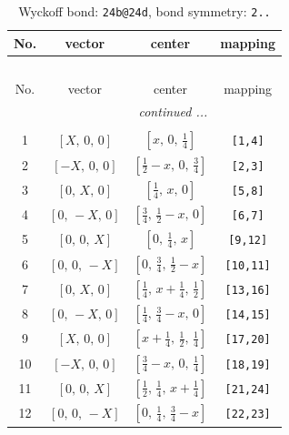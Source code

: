 \documentclass[fleqn,8pt]{jsarticle}
\begin{document}
\renewcommand{\arraystretch}{1.2}
\begin{longtable}{cccc}
\caption{Wyckoff bond: {\tt 24b@24d}, bond symmetry: {\tt 2..}}
 \\
 \hline \hline
No. & vector & center & mapping \\ \hline \endfirsthead

\multicolumn{3}{l}{\tablename\ \thetable{}} \\
 \hline \hline
No. & vector & center & mapping \\ \hline \endhead

 \hline \hline
\multicolumn{3}{r}{\footnotesize\it continued ...} \\ \endfoot

 \hline \hline
\multicolumn{3}{r}{} \\ \endlastfoot

1 & $\left[ X,\, 0,\, 0 \right]$ & $\left[ x,\, 0,\, \frac{1}{4} \right]$ & {\tt [1,4]} \\ \hline
2 & $\left[ - X,\, 0,\, 0 \right]$ & $\left[ \frac{1}{2} - x,\, 0,\, \frac{3}{4} \right]$ & {\tt [2,3]} \\ \hline
3 & $\left[ 0,\, X,\, 0 \right]$ & $\left[ \frac{1}{4},\, x,\, 0 \right]$ & {\tt [5,8]} \\ \hline
4 & $\left[ 0,\, - X,\, 0 \right]$ & $\left[ \frac{3}{4},\, \frac{1}{2} - x,\, 0 \right]$ & {\tt [6,7]} \\ \hline
5 & $\left[ 0,\, 0,\, X \right]$ & $\left[ 0,\, \frac{1}{4},\, x \right]$ & {\tt [9,12]} \\ \hline
6 & $\left[ 0,\, 0,\, - X \right]$ & $\left[ 0,\, \frac{3}{4},\, \frac{1}{2} - x \right]$ & {\tt [10,11]} \\ \hline
7 & $\left[ 0,\, X,\, 0 \right]$ & $\left[ \frac{1}{4},\, x + \frac{1}{4},\, \frac{1}{2} \right]$ & {\tt [13,16]} \\ \hline
8 & $\left[ 0,\, - X,\, 0 \right]$ & $\left[ \frac{1}{4},\, \frac{3}{4} - x,\, 0 \right]$ & {\tt [14,15]} \\ \hline
9 & $\left[ X,\, 0,\, 0 \right]$ & $\left[ x + \frac{1}{4},\, \frac{1}{2},\, \frac{1}{4} \right]$ & {\tt [17,20]} \\ \hline
10 & $\left[ - X,\, 0,\, 0 \right]$ & $\left[ \frac{3}{4} - x,\, 0,\, \frac{1}{4} \right]$ & {\tt [18,19]} \\ \hline
11 & $\left[ 0,\, 0,\, X \right]$ & $\left[ \frac{1}{2},\, \frac{1}{4},\, x + \frac{1}{4} \right]$ & {\tt [21,24]} \\ \hline
12 & $\left[ 0,\, 0,\, - X \right]$ & $\left[ 0,\, \frac{1}{4},\, \frac{3}{4} - x \right]$ & {\tt [22,23]} \\
\end{longtable}
\end{document}
